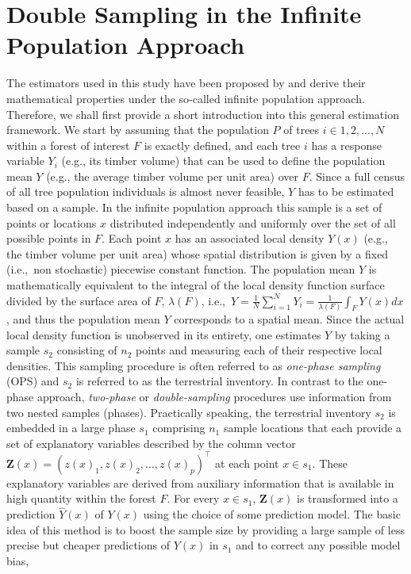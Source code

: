\documentclass[remotesensing,article,accept,moreauthors,pdftex,10pt,a4paper]{Definitions/mdpi}
\begin{document}
\section{Double Sampling in the Infinite Population Approach}
\label{sec:inf_pop}
\vspace{-6pt}


The estimators used in this study have been proposed by \citep{mandallaz2013a,mandallaz2013b} and derive their mathematical properties under the so-called infinite population approach. Therefore, we shall first provide a short introduction into this general estimation framework. We start by assuming that the population $P$ of trees $i \in 1,2, ..., N$ within a forest of interest $F$ is exactly defined, and each tree $i$ has a response variable $Y_i$ (e.g., its timber volume) that can be used to define the population mean $Y$ (e.g., the average timber volume per unit area) over $F$. Since a full census of all tree population individuals is almost never feasible, $Y$ has to be estimated based on a sample. In the infinite population approach this sample is a set of points or locations $x$ distributed independently and uniformly over the set of all possible points in $F$. Each point $x$ has an associated local density $Y(x)$ (e.g., the timber volume per unit area) whose spatial distribution is given by a fixed (i.e.,~non stochastic) piecewise constant function. The population mean $Y$ is mathematically equivalent to the integral of the local density function surface divided by the surface area of $F$, $\lambda(F)$, i.e.,~$Y = \frac{1}{N} \sum_{i = 1}^{N}Y_i = \frac{1}{\lambda(F)}\int_{F}Y(x)dx$, and thus the population mean $Y$ corresponds to a spatial mean. Since the actual local density function is unobserved in its entirety, one estimates $Y$ by taking a sample $s_2$ consisting of $n_2$ points and measuring each of their respective local densities. This sampling procedure is often referred to as \textit{one-phase sampling} (OPS) and $s_2$ is referred to as the terrestrial inventory. In contrast to the one-phase approach, \textit{two-phase} or \textit{double-sampling} procedures use information from two nested samples (phases). Practically speaking, the terrestrial inventory $s_2$ is embedded in a large phase $s_1$ comprising $n_1$ sample locations that each provide a set of explanatory variables described by the column vector $\pmb{Z}(x) = (z(x)_1, z(x)_2,...,z(x)_p)^{\top}$ at each point $x \in s_1$. These explanatory variables are derived from auxiliary information that is available in high quantity within the forest $F$. For every $x \in s_1$, $\pmb{Z}(x)$ is transformed into a prediction $\hat{Y}(x)$ of $Y(x)$ using the choice of some prediction model. The basic idea of this method is to boost the sample size by providing a large sample of less precise but cheaper predictions of $Y(x)$ in $s_1$ and to correct any possible model bias, 
\end{document}
